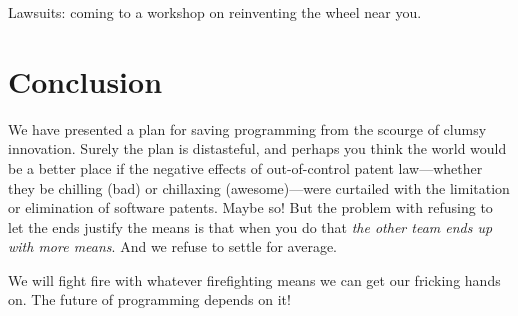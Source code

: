 \documentclass[acmtocl]%
{boviktrans}
\begin{document}
Lawsuits: coming to a workshop on reinventing the wheel near you.

\section{Conclusion}

We have presented a plan for saving programming from the scourge of
clumsy innovation. Surely the plan is distasteful, and perhaps you
think the world would be a better place if the negative effects of
out-of-control patent law---whether they be chilling (bad) or chillaxing
(awesome)---were curtailed with the limitation or elimination of
software patents. Maybe so! But the problem with refusing to let the
ends justify the means is that when you do that {\it the other team
  ends up with more means}. And we refuse to settle for average.

We will fight fire with whatever
firefighting means we can get our fricking hands on. 
The future of programming depends on
it!


\end{document}
